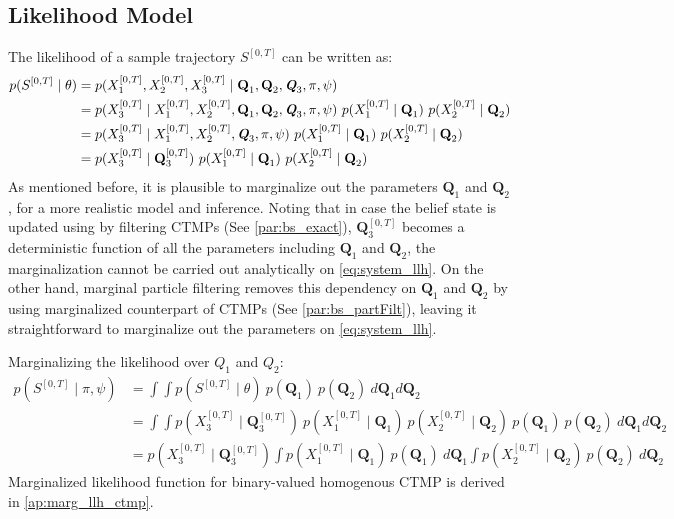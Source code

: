 \subsection{Likelihood Model}
 The likelihood of a sample trajectory $ S^{[0,T]} $ can be written as:
\begin{align}
p(S^{[0,T]} \mid \theta ) & = p(X_{1}^{[0, T]}, X_{2}^{[0, T]}, X_{3}^{[0, T]} \mid \textbf{Q}_{1}, \textbf{Q}_{2}, \textit{\textbf{Q}}_3, \pi, \psi) \nonumber\\
& = p(X_{3}^{[0, T]} \mid X_{1}^{[0, T]}, X_{2}^{[0, T]}, \textbf{Q}_{1}, \textbf{Q}_{2}, \textit{\textbf{Q}}_3, \pi, \psi) \ p(X_{1}^{[0, T]}\mid \textbf{Q}_{1}) \ p(X_{2}^{[0, T]}\mid \textbf{Q}_{2}) \nonumber\\ & = p(X_{3}^{[0, T]} \mid X_{1}^{[0, T]}, X_{2}^{[0, T]}, \textit{\textbf{Q}}_3, \pi, \psi) \ p(X_{1}^{[0, T]}\mid \textbf{Q}_{1}) \ p(X_{2}^{[0, T]}\mid \textbf{Q}_{2}) \nonumber\\ & = p(X_{3}^{[0, T]}\mid \textbf{Q}_{3}^{[0, T]}) \ p(X_{1}^{[0, T]}\mid \textbf{Q}_{1}) \ p(X_{2}^{[0, T]}\mid \textbf{Q}_{2}) 
\label{eq:system_llh}
\end{align}
As mentioned before, it is plausible to marginalize out the parameters $ \textbf{Q}_1 $ and $ \textbf{Q}_2 $, for a more realistic model and inference. Noting that in case the belief state is updated using by filtering CTMPs (See \cref{par:bs_exact}), $ \textbf{Q}_{3}^{[0, T]} $ becomes a deterministic function of all the parameters including $ \textbf{Q}_1 $ and $ \textbf{Q}_2 $, the marginalization cannot be carried out analytically on \autoref{eq:system_llh}. On the other hand, marginal particle filtering removes this dependency on $ \textbf{Q}_1 $ and $ \textbf{Q}_2 $ by using marginalized counterpart of CTMPs (See \cref{par:bs_partFilt}), leaving it straightforward to marginalize out the parameters on \autoref{eq:system_llh}.

Marginalizing the likelihood over $ Q_{1} $ and $ Q_{2} $:
\begin{align}
p(S^{[0,T]} \mid \pi, \psi ) & = 	\int \int p(S^{[0,T]} \mid \theta ) \ p(\textbf{Q}_{1}) \ p(\textbf{Q}_{2}) \ d\textbf{Q}_{1}d\textbf{Q}_{2} \nonumber\\ 
& = \int \int p(X_{3}^{[0, T]}\mid \textbf{Q}_{3}^{[0, T]}) \ p(X_{1}^{[0, T]}\mid \textbf{Q}_{1}) \ p(X_{2}^{[0, T]}\mid \textbf{Q}_{2}) \ p(\textbf{Q}_{1}) \ p(\textbf{Q}_{2})\ d\textbf{Q}_{1}d\textbf{Q}_{2} \nonumber\\ 
& = p(X_{3}^{[0, T]}\mid \textbf{Q}_{3}^{[0, T]}) \int  p(X_{1}^{[0, T]}\mid \textbf{Q}_{1}) \ p(\textbf{Q}_{1}) \ d\textbf{Q}_{1} \int p(X_{2}^{[0, T]}\mid \textbf{Q}_{2})\ p(\textbf{Q}_{2})\ d\textbf{Q}_{2}
\label{eq:Marg_llh}
\end{align}
Marginalized likelihood function for binary-valued homogenous CTMP is derived in \autoref{ap:marg_llh_ctmp}.

